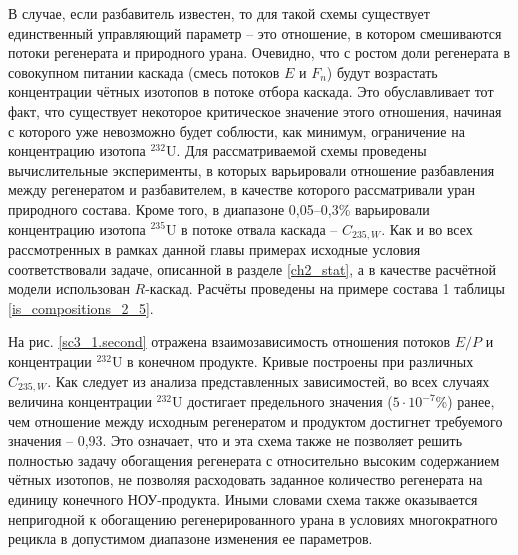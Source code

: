 В случае, если разбавитель известен, то для такой схемы существует единственный управляющий параметр -- это отношение, в котором смешиваются потоки регенерата и природного урана. Очевидно, что с ростом доли регенерата в совокупном питании каскада (смесь потоков $E$ и $F_n$) будут возрастать концентрации чётных изотопов в потоке отбора каскада. Это обуславливает тот факт, что существует некоторое критическое значение этого отношения, начиная с которого уже невозможно будет соблюсти, как минимум, ограничение на концентрацию изотопа $^{232}$U. Для рассматриваемой схемы проведены вычислительные эксперименты, в которых варьировали отношение разбавления между регенератом и разбавителем, в качестве которого рассматривали уран природного состава. Кроме того, в диапазоне 0,05--0,3\% варьировали концентрацию изотопа $^{235}$U в потоке отвала каскада -- $C_{235, W}$. Как и во всех рассмотренных в рамках данной главы примерах исходные условия соответствовали задаче, описанной в разделе \ref{ch2_stat}, а в качестве расчётной модели использован $R$-каскад. Расчёты проведены на примере состава 1 таблицы \ref{is_compositions_2_5}. 

На рис. \ref{sc3_1.second} отражена взаимозависимость отношения потоков $E/P$ и концентрации $^{232}$U в конечном продукте. Кривые построены при различных $C_{235, W}$. Как следует из анализа представленных зависимостей, во всех случаях величина концентрации  $^{232}$U достигает предельного значения ($5\cdot10^{-7}$\%) ранее, чем отношение между исходным регенератом и продуктом достигнет требуемого значения -- 0,93. Это означает, что и эта схема также не позволяет решить полностью задачу обогащения регенерата с относительно высоким содержанием чётных изотопов, не позволяя расходовать заданное количество регенерата на единицу конечного НОУ-продукта. Иными словами схема также оказывается непригодной к обогащению регенерированного урана в условиях многократного рецикла в допустимом диапазоне изменения ее параметров.

